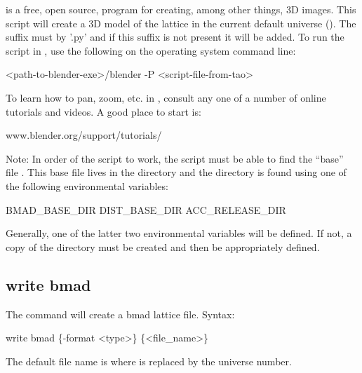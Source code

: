 {{{{{{{{{ is a free, open source, program for creating, among other things, 3D images. This
script will create a 3D model of the lattice in the current default universe
(). The suffix must by '.py' and if this suffix is not present it will be added. To
run the script in , use the following on the operating system command line:
\begin{example}
  <path-to-blender-exe>/blender -P <script-file-from-tao>
\end{example}
To learn how to pan, zoom, etc. in , consult any one of a number of online tutorials and
videos. A good place to start is:
\begin{example}
  www.blender.org/support/tutorials/  
\end{example}
Note: In order of the script to work, the script must be able to find the ``base'' file
. This base file lives in the  directory and the 
directory is found using one of the following environmental variables:
\begin{example}
  BMAD_BASE_DIR
  DIST_BASE_DIR
  ACC_RELEASE_DIR
\end{example}
Generally, one of the latter two environmental variables will be defined.  If not, a copy of the
\bmad directory must be created and then  be appropriately defined.


\subsection{write bmad}
\label{s:write.bmad}

The  command will create a bmad lattice file. Syntax:
\begin{example}
    write bmad \{-format <type>\} \{<file_name>\} 
\end{example}

The default file name is  where \vn{\#} is replaced by the universe number. 

}}}}}}}}}
